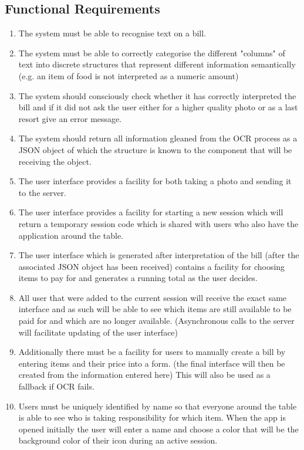 \documentclass[12pt,a4paper]{article}
\begin{document}
	\subsection{Functional Requirements}
		\begin{enumerate}
				\item The system must be able to recognise text on a bill.
				\item The system must be able to correctly categorise the different "columns" of text into discrete structures that represent different information semantically (e.g. an item of food is not interpreted as a numeric amount)
				\item The system should consciously check whether it has correctly interpreted the bill and if it did not ask the user either for a higher quality photo or as a last resort give an error message.
				\item The system should return all information gleaned from the OCR process as a JSON object of which the structure is known to the component that will be receiving the object.
				\item The user interface provides a facility for both taking a photo and sending it to the server.
				\item The user interface provides a facility for starting a new session which will return a temporary session code which is shared with users who also have the application around the table.
				\item The user interface which is generated after interpretation of the bill (after the associated JSON object has been received) contains a  facility for choosing items to pay for and generates a running total as the user decides.
				\item All user that were added to the current session will receive the exact same interface and as such will be able to see which items are still available to be paid for and which are no longer available. (Asynchronous calls to the server will facilitate updating of the user interface)
				\item Additionally there must be a facility for users to manually create a bill by entering items and their price into a form. (the final interface will then be created from the information entered here) This will also be used as a fallback if OCR fails.
				\item Users must be uniquely identified by name so that everyone around the table is able to see who is taking responsibility for which item. When the app is opened initially the user will enter a name and choose a color that will be the background color of their icon during an active session.
			\end{enumerate}
\end{document}
